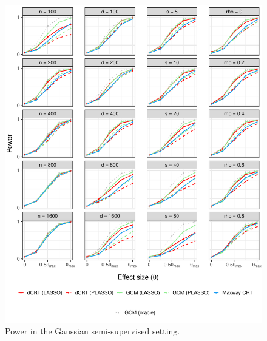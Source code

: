 \documentclass[aos]{imsart}
\theoremstyle{plain}
\theoremstyle{remark}
\begin{document}
\begin{figure}[!ht]
	\centering
	\includegraphics[width = \textwidth]{figures/gaussian_semi_supervised_setting_alternative.pdf}
	\caption{Power in the Gaussian semi-supervised setting.}
	\label{fig:gaussian_semi-supervised_alternative}
\end{figure}
\end{document}
